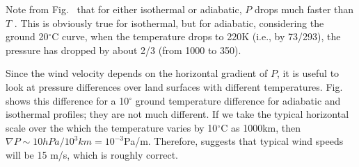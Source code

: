 \documentclass[11pt]{book}
\begin{document}
Note from Fig.~ that for either isothermal or adiabatic,  $P$ drops much faster than $T$ . This is obviously true for isothermal, but for adiabatic, considering the ground  20$^\circ$C curve, when the temperature drops to 220K (i.e., by 73/293), the pressure has dropped by about 2/3 (from 1000 to 350).





Since the wind velocity depends on the horizontal gradient of $P$, it is useful to look at pressure differences over land surfaces with different temperatures. Fig.~ shows this difference for a 10$^\circ$ ground temperature difference for adiabatic and isothermal profiles; they are not much different. If we take the typical horizontal scale over the which the temperature varies by 10$^\circ$C as 1000km, then $\nabla P\sim 10hPa/10^3km = 10^{-3}$Pa/m. Therefore,  suggests that typical wind speeds will be 15 m/s, which is roughly correct.
\end{document}
